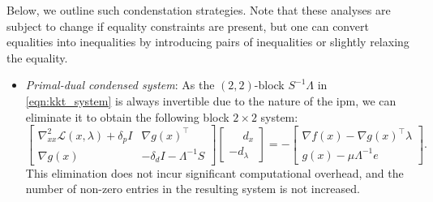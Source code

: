 \documentclass{article}
\begin{document}
Below, we outline such condenstation strategies. Note that these analyses are subject to change if equality constraints are present, but one can convert equalities  into inequalities by introducing pairs of inequalities or slightly relaxing the equality. 
\begin{itemize}[leftmargin=*,itemsep=0pt,parsep=0pt,partopsep=0pt]
\item \textit{Primal-dual condensed system}:
As the $(2,2)$-block $S^{-1}\Lambda$ in \cref{eqn:kkt_system} is always invertible due to the nature of the \gls*{ipm}, we can eliminate it to obtain the following block $2\times 2$ system:
\begin{equation}\label{eqn:augmentedKKT}
  \begin{bmatrix}
    \nabla^2_{x x} \mathcal{L}(x,\lambda) + \delta_p I & \nabla g(x)^\top \\
    \nabla g(x) &  - \delta_d I - \Lambda^{-1} S
  \end{bmatrix}
  \begin{bmatrix}
    \phantom{-}d_x\\
    - d_\lambda
  \end{bmatrix} =
  -\begin{bmatrix}
    \nabla f(x) - \nabla g(x)^\top \lambda\\
    g(x) - \mu \Lambda^{-1} e
  \end{bmatrix}.
\end{equation}
This elimination does not incur significant computational overhead, and the number of non-zero entries in the resulting system is not increased. 


\end{itemize}
\end{document}
